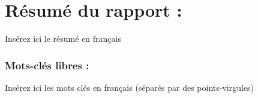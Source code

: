 \section*{Résumé du rapport :}
Insérez ici le résumé en français

\subsubsection*{Mots-clés libres :}
Insérez ici les mots clés en français (séparés par des points-virgules)
